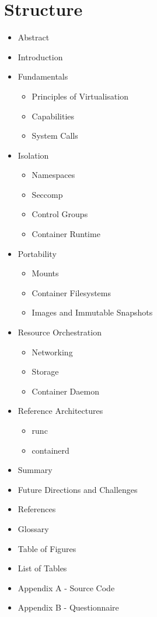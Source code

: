 \documentclass[english]{lni}
\begin{document}
\section{Structure}
\begin{itemize}
    \item Abstract
    \item Introduction
    \item Fundamentals 
    \begin{itemize}
        \item Principles of Virtualisation 
        \item Capabilities
        \item System Calls 
    \end{itemize}
    \item Isolation
    \begin{itemize}
        \item Namespaces 
        \item Seccomp 
        \item Control Groups
        \item Container Runtime
    \end{itemize}
    \item Portability 
    \begin{itemize}
        \item Mounts 
        \item Container Filesystems
        \item Images and Immutable Snapshots 
    \end{itemize}
    \item Resource Orchestration  
    \begin{itemize}
        \item Networking 
        \item Storage
        \item Container Daemon 
    \end{itemize}
    \item Reference Architectures 
    \begin{itemize}
        \item runc 
        \item containerd
    \end{itemize}
    \item Summary
    \item Future Directions and Challenges 
    \item References 
    \item Glossary 
    \item Table of Figures 
    \item List of Tables 
    \item Appendix A - Source Code 
    \item Appendix B - Questionnaire 
\end{itemize}
\end{document}
